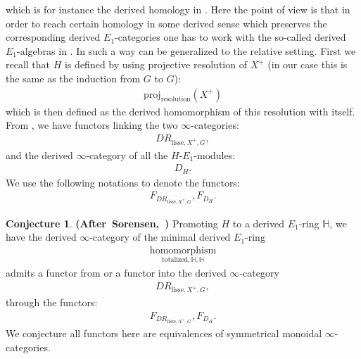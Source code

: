 \documentclass[12pt]{article}
\theoremstyle{definition}
\newtheorem{conjecture}{Conjecture}
\begin{document}
which is for instance the derived homology in \cite{Sa}. Here the point of view is that in order to reach certain homology in some derived sense which preserves the corresponding derived $E_1$-categories one has to work with the so-called derived $E_1$-algebras in \cite{Sa}. In such a way \cite{So1} can be generalized to the relative setting. First we recall that $H$ is defined by using projective resolution of $X^+$ (in our case this is the same as the induction from $G$ to $G$):
\begin{align}
\mathrm{proj}_\mathrm{resolution}(X^+)
\end{align}
which is then defined as the derived homomorphism of this resolution with itself. From \cite{Sc1}, \cite{HM} we have functors linking the two $\infty$-categories:
\begin{align}
DR_{\mathrm{lisse},X^+,G},
\end{align}
and the derived $\infty$-category of all the $H$-$E_1$-modules:
\begin{align}
D_H.
\end{align}
We use the following notations to denote the functors:
\begin{align}
F_{DR_{\mathrm{lisse},X^+,G}}, F_{D_H}.
\end{align}



\begin{conjecture}\mbox{\textbf{(After Sorensen, \cite[Theorem 1.1]{So1})}}
Promoting $H$ to a derived $E_1$-ring $\mathbb{H}$, we have the derived $\infty$-category of the minimal derived $E_1$-ring
\begin{align}
\underset{{\mathrm{totalized},\mathbb{H},\mathbb{H}}}{\mathrm{homomorphism}}
\end{align}
admits a functor from or a functor into the derived $\infty$-category
\begin{align}
DR_{\mathrm{lisse},X^+,G},
\end{align}
through the functors:
\begin{align}
F_{DR_{\mathrm{lisse},X^+,G}}, F_{D_H}.
\end{align}
We conjecture all functors here are equivalences of symmetrical monoidal $\infty$-categories.
\end{conjecture}
\end{document}
